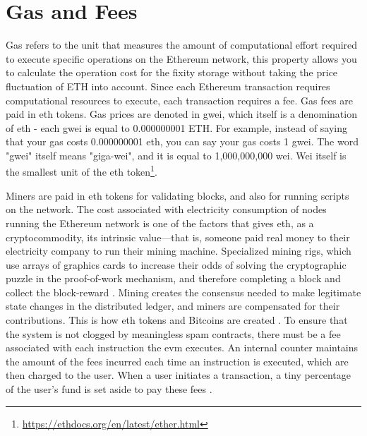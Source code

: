 \documentclass[final]{vutinfth}
\begin{document}
\section{Gas and Fees}
\label{sec:costs}
Gas refers to the unit that measures the amount of computational effort required to execute specific operations on the Ethereum network, this property allows you to calculate the operation cost for the fixity storage without taking the price fluctuation of ETH into account. Since each Ethereum transaction requires computational resources to execute, each transaction requires a fee.
Gas fees are paid in \acrlong{eth} tokens. Gas prices are denoted in \acrlong{gwei}, which itself is a denomination of \acrshort{eth} - each \acrshort{gwei} is equal to 0.000000001 ETH. For example, instead of saying that your gas costs 0.000000001 \acrlong{eth}, you can say your gas costs 1 \acrlong{gwei}. The word "\acrlong{gwei}" itself means "giga-wei", and it is equal to 1,000,000,000 wei. Wei itself is the smallest unit of the \acrlong{eth} token\footnote{\url{https://ethdocs.org/en/latest/ether.html}}.

Miners are paid in \acrlong{eth} tokens for validating blocks, and also for running scripts on the network. The cost associated with electricity consumption of nodes running the Ethereum network is one of the factors that gives \acrlong{eth}, as a cryptocommodity, its intrinsic value—that is, someone paid real money to their electricity company to run their mining machine. Specialized mining rigs, which use arrays of graphics cards to increase their odds of solving the cryptographic puzzle in the proof-of-work mechanism, and therefore completing a block and collect the block-reward \cite[12]{dannen2017introducing}. 
Mining creates the consensus needed to make legitimate state changes in the distributed ledger, and miners are compensated for their contributions. This is how \acrlong{eth} tokens and Bitcoins are created \cite[57]{dannen2017introducing}. 
To ensure that the system is not clogged by meaningless spam contracts, there must be a fee associated with each instruction the \acrshort{evm} executes. An internal counter maintains the amount of the fees incurred each time an instruction is executed, which are then charged to the user. When a user initiates a \gls{transaction}, a tiny percentage of the user's fund is set aside to pay these fees \cite[58]{dannen2017introducing}. 
\end{document}
